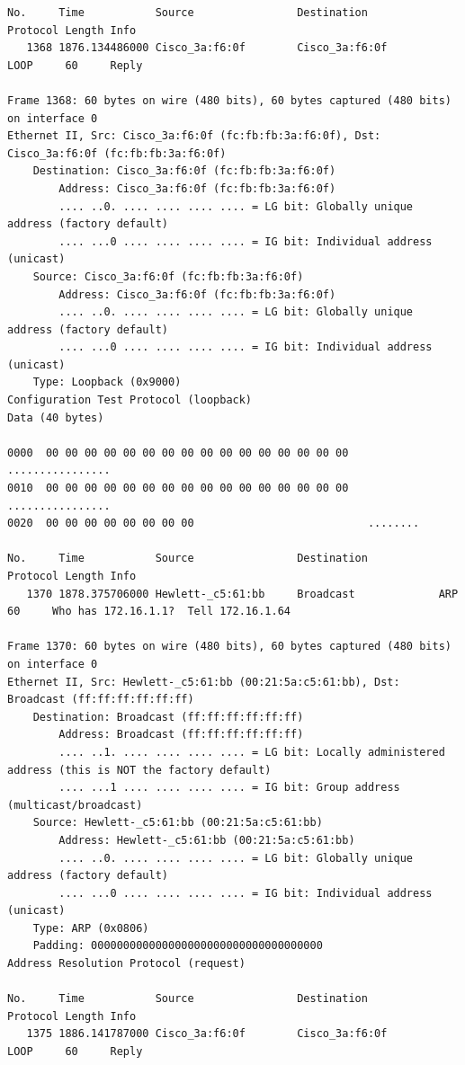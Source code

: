 \documentclass[a4paper,11pt]{article}
\begin{document}
\begin{lstlisting}
No.     Time           Source                Destination           Protocol Length Info
   1368 1876.134486000 Cisco_3a:f6:0f        Cisco_3a:f6:0f        LOOP     60     Reply

Frame 1368: 60 bytes on wire (480 bits), 60 bytes captured (480 bits) on interface 0
Ethernet II, Src: Cisco_3a:f6:0f (fc:fb:fb:3a:f6:0f), Dst: Cisco_3a:f6:0f (fc:fb:fb:3a:f6:0f)
    Destination: Cisco_3a:f6:0f (fc:fb:fb:3a:f6:0f)
        Address: Cisco_3a:f6:0f (fc:fb:fb:3a:f6:0f)
        .... ..0. .... .... .... .... = LG bit: Globally unique address (factory default)
        .... ...0 .... .... .... .... = IG bit: Individual address (unicast)
    Source: Cisco_3a:f6:0f (fc:fb:fb:3a:f6:0f)
        Address: Cisco_3a:f6:0f (fc:fb:fb:3a:f6:0f)
        .... ..0. .... .... .... .... = LG bit: Globally unique address (factory default)
        .... ...0 .... .... .... .... = IG bit: Individual address (unicast)
    Type: Loopback (0x9000)
Configuration Test Protocol (loopback)
Data (40 bytes)

0000  00 00 00 00 00 00 00 00 00 00 00 00 00 00 00 00   ................
0010  00 00 00 00 00 00 00 00 00 00 00 00 00 00 00 00   ................
0020  00 00 00 00 00 00 00 00                           ........

No.     Time           Source                Destination           Protocol Length Info
   1370 1878.375706000 Hewlett-_c5:61:bb     Broadcast             ARP      60     Who has 172.16.1.1?  Tell 172.16.1.64

Frame 1370: 60 bytes on wire (480 bits), 60 bytes captured (480 bits) on interface 0
Ethernet II, Src: Hewlett-_c5:61:bb (00:21:5a:c5:61:bb), Dst: Broadcast (ff:ff:ff:ff:ff:ff)
    Destination: Broadcast (ff:ff:ff:ff:ff:ff)
        Address: Broadcast (ff:ff:ff:ff:ff:ff)
        .... ..1. .... .... .... .... = LG bit: Locally administered address (this is NOT the factory default)
        .... ...1 .... .... .... .... = IG bit: Group address (multicast/broadcast)
    Source: Hewlett-_c5:61:bb (00:21:5a:c5:61:bb)
        Address: Hewlett-_c5:61:bb (00:21:5a:c5:61:bb)
        .... ..0. .... .... .... .... = LG bit: Globally unique address (factory default)
        .... ...0 .... .... .... .... = IG bit: Individual address (unicast)
    Type: ARP (0x0806)
    Padding: 000000000000000000000000000000000000
Address Resolution Protocol (request)

No.     Time           Source                Destination           Protocol Length Info
   1375 1886.141787000 Cisco_3a:f6:0f        Cisco_3a:f6:0f        LOOP     60     Reply


\end{lstlisting}
\end{document}
